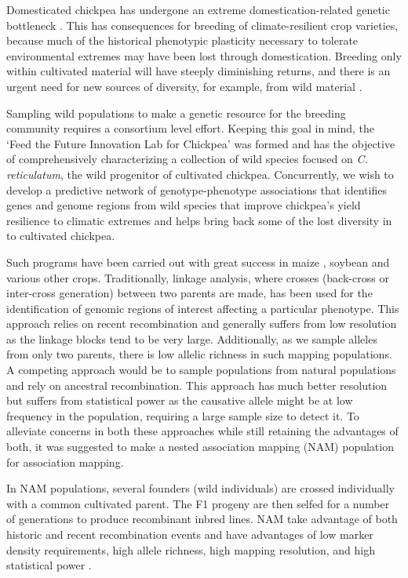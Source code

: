 Domesticated chickpea has undergone an extreme domestication-related genetic bottleneck \cite{vonWettberg2018}. This has consequences for breeding of climate-resilient crop varieties, because much of the historical phenotypic plasticity necessary to tolerate environmental extremes may have been lost through domestication. Breeding only within cultivated material will have steeply diminishing returns, and there is an urgent need for new sources of diversity, for example, from wild material \cite{McCouch2013, Dempewolf2014, Hajjar2007}.

Sampling wild populations to make a genetic resource for the breeding community requires a consortium level effort. Keeping this goal in mind, the `Feed the Future Innovation Lab for Chickpea' was formed and has the objective of comprehensively characterizing a collection of wild species focused on \emph{C. reticulatum}, the wild progenitor of cultivated chickpea. Concurrently, we wish to develop a predictive network of genotype-phenotype associations that identifies genes and genome regions from wild species that improve chickpea's yield resilience to climatic extremes and helps bring back some of the lost diversity in to cultivated chickpea. 

Such programs have been carried out with great success in maize \cite{McMullen2009}, soybean \cite{Bandillo2017} and various other crops. Traditionally, linkage analysis, where crosses (back-cross or inter-cross generation) between two parents are made, has been used for the identification of genomic regions of interest affecting a particular phenotype. This approach relies on recent recombination and generally suffers from low resolution as the linkage blocks tend to be very large. Additionally, as we sample alleles from only two parents, there is low allelic richness in such mapping populations. A competing approach would be to sample populations from natural populations and rely on ancestral recombination. This approach has much better resolution but suffers from statistical power as the causative allele might be at low frequency in the population, requiring a large sample size to detect it. To alleviate concerns in both these approaches while still retaining the advantages of both, it was suggested to make a nested association mapping (NAM) \cite{McMullen2009} population for association mapping. 

In NAM populations, several founders (wild individuals) are crossed individually with a common cultivated parent. The F1 progeny are then selfed for a number of generations to produce recombinant inbred lines. %
NAM take advantage of both historic and recent recombination events and have advantages of low marker density requirements, high allele richness, high mapping resolution, and high statistical power \cite{Yu2008, McMullen2009}. 

